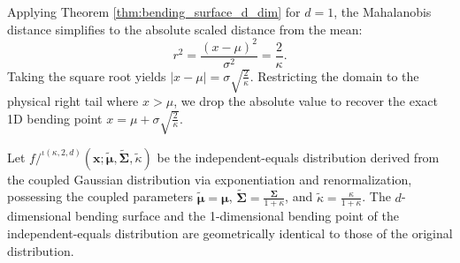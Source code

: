 \documentclass[twoside,11pt]{article}
\renewenvironment{proof}{\par\noindent{\bf Proof\ }}{\hfill\BlackBox\par\vspace{2mm}}
\begin{document}
\begin{proof}
Applying Theorem \ref{thm:bending_surface_d_dim} for $d=1$, the Mahalanobis distance simplifies to the absolute scaled distance from the mean:
\begin{equation}
    r^2 = \frac{(x - \mu)^2}{\sigma^2} = \frac{2}{\kappa}.
\end{equation}
Taking the square root yields $|x - \mu| = \sigma \sqrt{\frac{2}{\kappa}}$. Restricting the domain to the physical right tail where $x > \mu$, we drop the absolute value to recover the exact 1D bending point $x = \mu + \sigma \sqrt{\frac{2}{\kappa}}$.
\end{proof}

\begin{corollary}
\label{cor:independent_equals_invariance}
Let $f/^{\iota(\kappa,2,d)}\left(\mathbf{x};\tilde{\boldsymbol{\mu}},\widetilde{\boldsymbol{\Sigma}},\tilde{\kappa}\right)$ be the independent-equals distribution derived from the coupled Gaussian distribution via exponentiation and renormalization, possessing the coupled parameters $\tilde{\boldsymbol{\mu}} = \boldsymbol{\mu}$, $\widetilde{\boldsymbol{\Sigma}} = \frac{\boldsymbol{\Sigma}}{1+\kappa}$, and $\tilde{\kappa} = \frac{\kappa}{1+\kappa}$. The $d$-dimensional bending surface and the 1-dimensional bending point of the independent-equals distribution are geometrically identical to those of the original distribution.
\end{corollary}
\end{document}
